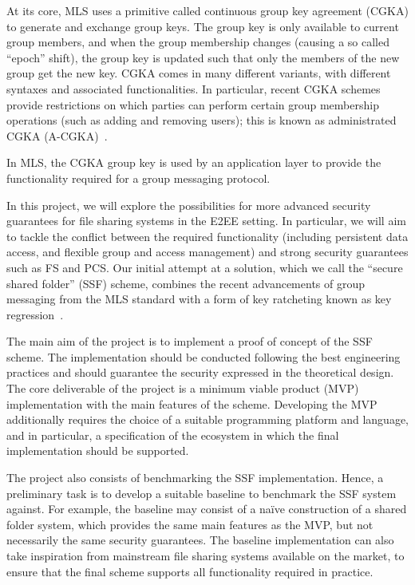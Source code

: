 \documentclass[E]{BAMASA}
\begin{document}
At its core, MLS uses a primitive called continuous group key agreement (CGKA) to generate and exchange group keys.
The group key is only available to current group members, and when the group membership changes (causing a so called ``epoch'' shift), the group key is updated such that only the members of the new group get the new key.
CGKA comes in many different variants, with different syntaxes and associated functionalities.
In particular, recent CGKA schemes provide restrictions on which parties can perform certain group membership operations (such as adding and removing users);
this is known as administrated CGKA (A-CGKA)~\cite{USENIX:BalColVau23}.

In MLS, the CGKA group key is used by an application layer to provide the functionality required for a group messaging protocol.


In this project, we will explore the possibilities for more advanced security guarantees for file sharing systems in the E2EE setting.
In particular, we will aim to tackle the conflict between the required functionality (including persistent data access, and flexible group and access management) and strong security guarantees such as FS and PCS.
Our initial attempt at a solution, which we call the ``secure shared folder'' (SSF) scheme, combines the recent advancements of group messaging from the MLS standard with a form of key ratcheting known as key regression~\cite{NDSS:FuKamKoh06}.




\desc
The main aim of the project is to implement a proof of concept of the SSF scheme.
The implementation should be conducted following the best engineering practices 
and should guarantee the security expressed in the theoretical design.
The core deliverable of the project is a minimum viable product (MVP) implementation with the main features of the scheme.
Developing the MVP additionally requires the choice of a suitable programming platform and language, and in particular, a specification of the ecosystem in which the final implementation should be supported.

The project also consists of benchmarking the SSF implementation.
Hence, a preliminary task is to develop a suitable baseline to benchmark the SSF system against.
For example, the baseline may consist of a na\"ive construction of a shared folder system, which provides the same main features as the MVP, but not necessarily the same security guarantees.
The baseline implementation can also take inspiration from mainstream file sharing systems available on the market, to ensure that the final scheme supports all functionality required in practice.
\end{document}
